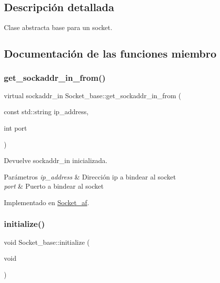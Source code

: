 \subsection{Descripción detallada}
Clase abstracta base para un socket. 

\subsection{Documentación de las funciones miembro}
\mbox{\label{classSocket__base_a887249ae6a25693230c0febf403a2545}} 
\subsubsection{\texorpdfstring{get\+\_\+sockaddr\+\_\+in\+\_\+from()}{get\_sockaddr\_in\_from()}}
{\footnotesize\ttfamily virtual sockaddr\+\_\+in Socket\+\_\+base\+::get\+\_\+sockaddr\+\_\+in\+\_\+from (\begin{DoxyParamCaption}\item[{const std\+::string}]{ip\+\_\+address,  }\item[{int}]{port }\end{DoxyParamCaption})\hspace{0.3cm}{\ttfamily [pure virtual]}}



Devuelve sockaddr\+\_\+in inicializada. 


\begin{DoxyParams}{Parámetros}
{\em ip\+\_\+address} & Dirección ip a bindear al socket \\
\hline
{\em port} & Puerto a bindear al socket \\
\hline
\end{DoxyParams}


Implementado en \hyperlink{classSocket__af_aa2f8fb1398c1e6f66832151e8c5bcf2e}{Socket\+\_\+af}.

\mbox{\label{classSocket__base_af0b9f713f4d6231c287198034fad662e}} 
\subsubsection{\texorpdfstring{initialize()}{initialize()}}
{\footnotesize\ttfamily void Socket\+\_\+base\+::initialize (\begin{DoxyParamCaption}\item[{void}]{ }\end{DoxyParamCaption})}



